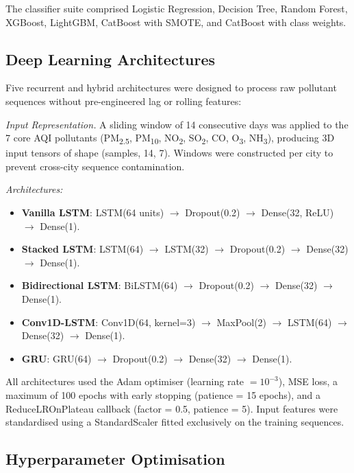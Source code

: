 \documentclass[conference]{IEEEtran}
\begin{document}
The classifier suite comprised Logistic Regression, Decision Tree, Random Forest, XGBoost, LightGBM, CatBoost with SMOTE, and CatBoost with class weights.

\subsection{Deep Learning Architectures}

Five recurrent and hybrid architectures were designed to process raw pollutant sequences without pre-engineered lag or rolling features:

\textit{Input Representation.} A sliding window of 14 consecutive days was applied to the 7 core AQI pollutants (PM\textsubscript{2.5}, PM\textsubscript{10}, NO\textsubscript{2}, SO\textsubscript{2}, CO, O\textsubscript{3}, NH\textsubscript{3}), producing 3D input tensors of shape (samples, 14, 7). Windows were constructed per city to prevent cross-city sequence contamination.

\textit{Architectures:}
\begin{itemize}
    \item \textbf{Vanilla LSTM}: LSTM(64 units) $\rightarrow$ Dropout(0.2) $\rightarrow$ Dense(32, ReLU) $\rightarrow$ Dense(1).
    \item \textbf{Stacked LSTM}: LSTM(64) $\rightarrow$ LSTM(32) $\rightarrow$ Dropout(0.2) $\rightarrow$ Dense(32) $\rightarrow$ Dense(1).
    \item \textbf{Bidirectional LSTM}: BiLSTM(64) $\rightarrow$ Dropout(0.2) $\rightarrow$ Dense(32) $\rightarrow$ Dense(1).
    \item \textbf{Conv1D-LSTM}: Conv1D(64, kernel=3) $\rightarrow$ MaxPool(2) $\rightarrow$ LSTM(64) $\rightarrow$ Dense(32) $\rightarrow$ Dense(1).
    \item \textbf{GRU}: GRU(64) $\rightarrow$ Dropout(0.2) $\rightarrow$ Dense(32) $\rightarrow$ Dense(1).
\end{itemize}

All architectures used the Adam optimiser (learning rate $= 10^{-3}$), MSE loss, a maximum of 100 epochs with early stopping (patience = 15 epochs), and a ReduceLROnPlateau callback (factor = 0.5, patience = 5). Input features were standardised using a StandardScaler fitted exclusively on the training sequences.

\subsection{Hyperparameter Optimisation}
\end{document}
